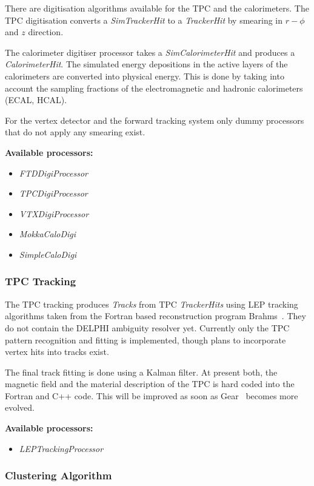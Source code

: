 There are digitisation algorithms available for the TPC and the 
calorimeters. 
The TPC digitisation converts a 
{\em SimTrackerHit} to a {\em TrackerHit} by smearing in $r-\phi$ and $z$ 
direction.

The calorimeter digitiser processor 
takes a {\em SimCalorimeterHit} and produces a {\em CalorimeterHit}. 
The simulated energy depositions in the active 
layers of the calorimeters are converted into physical energy. 
This is done by taking into account the sampling fractions of 
the electromagnetic and hadronic calorimeters (ECAL, HCAL). 

For the vertex detector and
the forward tracking system only dummy processors that do not apply any 
smearing exist.

{\bf Available processors:} 
\begin{itemize}
\item {\em FTDDigiProcessor}
\item {\em TPCDigiProcessor}
\item {\em VTXDigiProcessor}
\item {\em MokkaCaloDigi} 
\item {\em SimpleCaloDigi}
\end{itemize}

\subsubsection{TPC Tracking}

The TPC tracking produces {\em Tracks} from TPC {\em TrackerHits} using LEP 
tracking algorithms taken from the Fortran based reconstruction program 
Brahms~\cite{ref_brahms}. 
They do not contain the DELPHI ambiguity resolver yet.
Currently only the TPC pattern recognition and fitting is implemented, though 
plans to incorporate vertex hits into tracks exist.

The final track fitting is done using a Kalman filter. At present both, 
the magnetic field and the material description of the TPC is hard coded into 
the Fortran and C++ code.
This will be improved as soon as Gear~\cite{ref_gear} becomes more evolved.

{\bf Available processors:} 
\begin{itemize}
\item {\em LEPTrackingProcessor}
\end{itemize}

\subsubsection{Clustering Algorithm}

